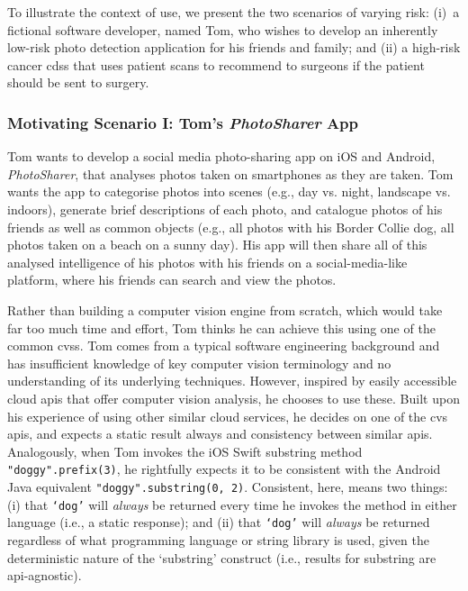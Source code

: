 To illustrate the context of use, we present the two scenarios of varying risk: (i)~a fictional software developer, named Tom, who wishes to develop an inherently low-risk photo detection application for his friends and family; and (ii) a high-risk cancer \gls{cdss} that uses patient scans to recommend to surgeons if the patient should be sent to surgery.
  
\subsubsection{Motivating Scenario I: Tom's \textit{PhotoSharer} App}
\label{ssec:introduction:motivation:scenario:pam}

Tom wants to develop a social media photo-sharing app on iOS and Android, \textit{PhotoSharer}, that analyses photos taken on smartphones as they are taken. Tom wants the app to categorise photos into scenes (e.g., day vs. night, landscape vs. indoors), generate brief descriptions of each photo, and catalogue photos of his friends as well as common objects (e.g., all photos with his Border Collie dog, all photos taken on a beach on a sunny day). His app will then share all of this analysed intelligence of his photos with his friends on a social-media-like platform, where his friends can search and view the photos.

Rather than building a computer vision engine from scratch, which would take far too much time and effort, Tom thinks he can achieve this using one of the common \glspl{cvs}. Tom comes from a typical software engineering background and has insufficient knowledge of key computer vision terminology and no understanding of its underlying techniques. However, inspired by easily accessible cloud \glspl{api} that offer computer vision analysis, he chooses to use these. Built upon his experience of using other similar cloud services, he decides on one of the \gls{cvs} \glspl{api}, and expects a static result always and consistency between similar \glspl{api}. Analogously, when Tom invokes the iOS Swift substring method \texttt{"doggy".prefix(3)}, he rightfully expects it to be consistent with the Android Java equivalent \texttt{"doggy".substring(0, 2)}. Consistent, here, means two things: (i) that \texttt{`dog'} will \textit{always} be returned every time he invokes the method in either language (i.e., a static response); and (ii) that \texttt{`dog'} will \textit{always} be returned regardless of what programming language or string library is used, given the deterministic nature of the `substring' construct (i.e., results for substring are \gls{api}-agnostic). 


